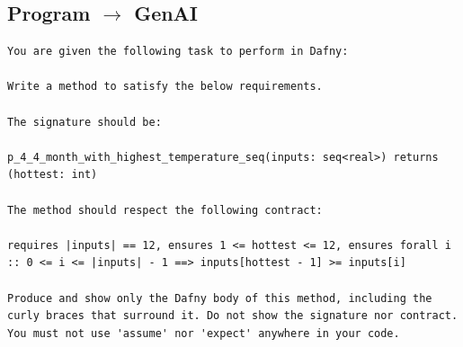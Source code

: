 \documentclass{article}
\begin{document}
\subsection*{Program $\rightarrow$ GenAI}
\begin{lstlisting}
You are given the following task to perform in Dafny:

Write a method to satisfy the below requirements.

The signature should be:

p_4_4_month_with_highest_temperature_seq(inputs: seq<real>) returns (hottest: int)

The method should respect the following contract:

requires |inputs| == 12, ensures 1 <= hottest <= 12, ensures forall i :: 0 <= i <= |inputs| - 1 ==> inputs[hottest - 1] >= inputs[i]

Produce and show only the Dafny body of this method, including the curly braces that surround it. Do not show the signature nor contract. You must not use 'assume' nor 'expect' anywhere in your code.
\end{lstlisting}
\end{document}
